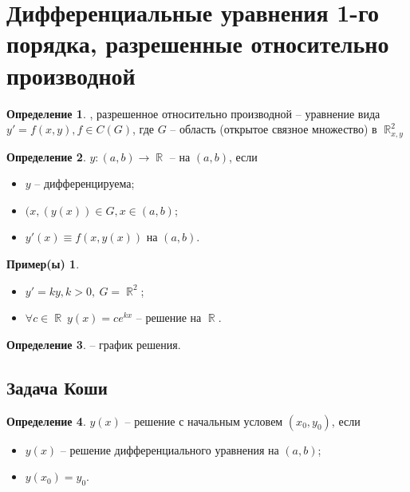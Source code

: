 \documentclass[a4paper]{article}
\theoremstyle{indented}
\theoremstyle{definition}
\newtheorem*{defn}{Определение}
\newtheorem*{exl}{Пример(ы)}
\theoremstyle{remark}
\DeclareMathOperator{\RR}{\mathbb{R}}
\begin{document}
\section{Дифференциальные уравнения 1-го порядка, разрешенные относительно производной}
\begin{defn}
  , разрешенное относительно производной -- уравнение вида $y' = f(x,y), f \in C(G)$, где $G$ -- область (открытое связное множество) в $\RR_{x,y}^2$
\end{defn}
\begin{defn}
  $y : (a,b) \to \RR$ --  на $(a,b)$, если  
  \begin{itemize}
    \item $y$ -- дифференцируема;
    \item $(x,(y(x)) \in G, x \in (a,b)$;
    \item $y'(x) \equiv f(x,y(x))$ на $(a,b)$.
  \end{itemize} 
\end{defn}
\begin{exl} \ 
  \begin{itemize}
    \item $y' = ky, k > 0, \  G = \RR^2$;
    \item $\forall c \in \RR \  y(x) = ce^{kx}$ -- решение на $\RR$.
  \end{itemize}
\end{exl}
\begin{defn}
   -- график решения.
\end{defn}
\subsection{Задача Коши}
\begin{defn}
$y(x)$ -- решение  с начальным условем $(x_0,y_0)$, если
\begin{itemize}
    \item $y(x)$ -- решение дифференциального уравнения на $(a,b)$;
    \item $y(x_0) = y_0$.
\end{itemize}
\end{defn}
\end{document}
